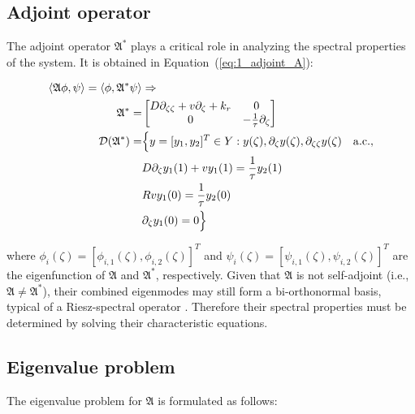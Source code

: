 \subsection{Adjoint operator}

The adjoint operator $\mathfrak{A}^*$ plays a critical role in analyzing the spectral properties of the system. It is obtained in Equation~(\ref{eq:1_adjoint_A}):

\begin{equation} \label{eq:1_adjoint_A}
    \begin{aligned}
        \langle \mathfrak{A} {\phi}, {\psi}\rangle  = \langle {\phi}, {\mathfrak{A}}^{*} {\psi}\rangle  &\Rightarrow \\
        {\mathfrak{A}}^{*} =&
        \begin{bmatrix}
            D \partial_{\zeta \zeta} + v \partial_\zeta +k_r & 0\\
            0 & -\frac{1}{\tau} \partial_\zeta
        \end{bmatrix}\\
        \mathcal{D}(\mathfrak{A}^*) =& \Bigl\{ {y} = [y_1, y_2]^T \in Y:
        {y}(\zeta), \partial_\zeta {y}(\zeta), \partial_{\zeta \zeta} {y}(\zeta) \quad \mathrm{a.c.},\\
        &D \partial_\zeta y_1(1) + v y_1(1) = \frac{1}{\tau} y_2(1) \\
        &R v y_1(0) = \frac{1}{\tau} y_2(0) \\
        &\partial_\zeta y_1(0) = 0 \Bigr\}
    \end{aligned}
\end{equation}

where ${\phi_i}(\zeta) = [\phi_{i,1}(\zeta), \phi_{i,2}(\zeta)]^T$ and ${\psi_i}(\zeta) = [\psi_{i,1}(\zeta), \psi_{i,2}(\zeta)]^T$ are the eigenfunction of $\mathfrak{A}$ and $\mathfrak{A}^*$, respectively. Given that $\mathfrak{A}$ is not self-adjoint (i.e., $\mathfrak{A} \neq \mathfrak{A}^*$), their combined eigenmodes may still form a bi-orthonormal basis, typical of a Riesz-spectral operator \autocite{Curtain2020Introduction}. Therefore their spectral properties must be determined by solving their characteristic equations.

\subsection{Eigenvalue problem}

The eigenvalue problem for $\mathfrak{A}$ is formulated as follows:

